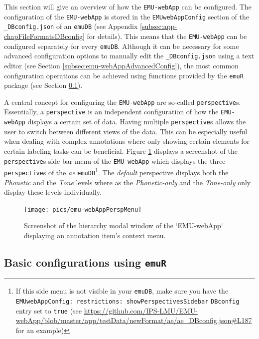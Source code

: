\documentclass[]{book}
\let\rmarkdownfootnote\footnote%
\def\footnote{\protect\rmarkdownfootnote}
\begin{document}
This section will give an overview of how the \texttt{EMU-webApp} can be configured. The configuration of the \texttt{EMU-webApp} is stored in the \texttt{EMUwebAppConfig} section of the \texttt{\_DBconfig.json} of an \texttt{emuDB} (see Appendix \ref{subsec:app-chapFileFormatsDBconfig} for details). This means that the \texttt{EMU-webApp} can be configured separately for every \texttt{emuDB}. Although it can be necessary for some advanced configuration options to manually edit the \texttt{\_DBconfig.json} using a text editor (see Section \ref{subsec:emu-webAppAdvancedConfig}), the most common configuration operations can be achieved using functions provided by the \texttt{emuR} package (see Section \ref{subsec:emu-webAppConfigWithEmuR}).

A central concept for configuring the \texttt{EMU-webApp} are so-called \texttt{perspective}s. Essentially, a \texttt{perspective} is an independent configuration of how the \texttt{EMU-webApp} displays a certain set of data. Having multiple \texttt{perspective}s allows the user to switch between different views of the data. This can be especially useful when dealing with complex annotations where only showing certain elements for certain labeling tasks can be beneficial. Figure \ref{fig:webApp-perspMenu} displays a screenshot of the \texttt{perspective}s side bar menu of the \texttt{EMU-webApp} which displays the three \texttt{perspective}s of the \emph{ae} \texttt{emuDB}\footnote{If this side menu is not visible in your \texttt{emuDB}, make sure you have the \texttt{EMUwebAppConfig:\ restrictions:\ showPerspectivesSidebar} \texttt{DBconfig} entry set to \texttt{true} (see \url{https://github.com/IPS-LMU/EMU-webApp/blob/master/app/testData/newFormat/ae/ae_DBconfig.json\#L187} for an example)}. The \emph{default} perspective displays both the \emph{Phonetic} and the \emph{Tone} levels where as the \emph{Phonetic-only} and the \emph{Tone-only} only display these levels individually.

\begin{figure}

{\centering \texttt{[image: pics/emu-webAppPerspMenu]} 

}

\caption{Screenshot of the hierarchy modal window of the `EMU-webApp` displaying an annotation item's context menu.}\label{fig:webApp-perspMenu}
\end{figure}

\hypertarget{subsec:emu-webAppConfigWithEmuR}{%
\subsection{\texorpdfstring{Basic configurations using \texttt{emuR}}{Basic configurations using emuR}}\label{subsec:emu-webAppConfigWithEmuR}}
\end{document}
